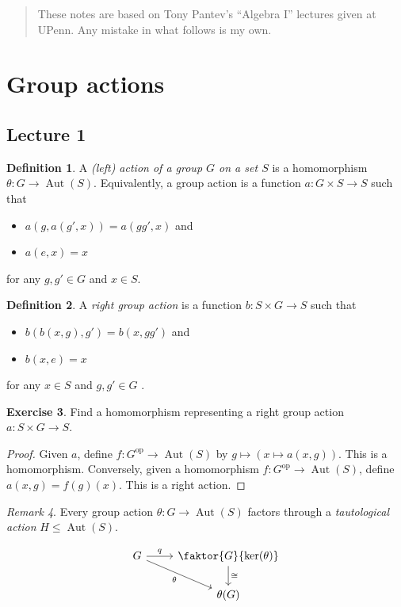 \documentclass[10pt,letterpaper,cm]{nupset}
\theoremstyle{definition}
\newtheorem{definition}{Definition}[subsection]
\theoremstyle{theorem}
\newtheorem{exercise}[definition]{Exercise}
\theoremstyle{remark}
\newtheorem{remark}[definition]{Remark}
\newcommand{\1}{\mathbf{1}}
\newcommand{\0}{\vec 0}
\DeclareMathOperator{\aut}{Aut}
\DeclareMathOperator{\op}{op}
\begin{document}
\begin{abstract}
These notes are based on Tony Pantev's ``Algebra I'' lectures given at UPenn. Any mistake in what follows is my own.
\end{abstract}

\tableofcontents
\newpage

\section{Group actions}

\subsection{Lecture 1}

\begin{definition} 
A \textit{(left) action of a group $G$ on a set $S$} is a homomorphism $\theta : G \to \aut(S)$. Equivalently, a group action is a function $a : G \times S \to S$ such that 
\begin{itemize}
\item $a(g, a(g', x)) = a(gg', x)$ and
\item $a(e, x) = x$
\end{itemize}
for any $g,g' \in G$ and $x\in S$. 
\end{definition}

\begin{definition}
A \textit{right group action} is a function $b: S \times G \to S$ such that 
\begin{itemize}
\item $b(b(x, g), g') = b(x, gg')$ and
\item $b(x, e) = x$
\end{itemize}
for any $x\in S$ and $g,g' \in G$ . 
\end{definition}

\theoremstyle{exercise}
\begin{exercise} Find a homomorphism representing a right group action $a: S \times G \to S$.
\end{exercise}
\begin{proof}
Given $a$, define $f: G^{\op} \to \aut(S)$ by $g \mapsto (x \mapsto a(x, g))$. This is a homomorphism. Conversely, given a homomorphism $f: G^{\op} \to \aut(S)$, define $a(x, g) = f(g)(x)$. This is a right action.
\end{proof}

\theoremstyle{remark}
\begin{remark}{Every group action $\theta: G \to \aut(S)$ factors through a \textit{tautological action} $H \leq \aut(S)$. }

\[ \begin{tikzcd}
G \arrow{r}{q} \arrow[swap]{dr} {\theta} & \faktor{G}{\ker(\theta)} \arrow{d}{\cong} \\%
 & \theta(G)
\end{tikzcd}
\]
\end{remark}
\end{document}
